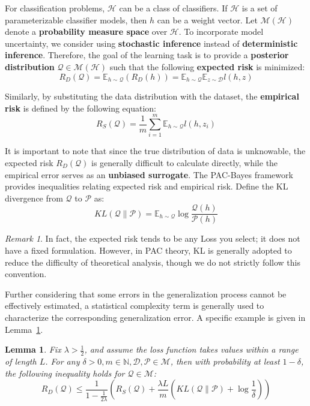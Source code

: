 \documentclass{article}
\theoremstyle{plain}
\newtheorem{lemma}[theorem]{Lemma}
\theoremstyle{definition}
\theoremstyle{remark}
\newtheorem{remark}[theorem]{Remark}
\begin{document}
For classification problems, $\mathcal{H}$ can be a class of classifiers. If $\mathcal{H}$ is a set of parameterizable classifier models, then $h$ can be a weight vector. Let $\mathcal{M}(\mathcal{H})$ denote a \textbf{probability measure space} over $\mathcal{H}$. To incorporate model uncertainty, we consider using \textbf{stochastic inference} instead of \textbf{deterministic inference}. Therefore, the goal of the learning task is to provide a \textbf{posterior distribution} $\mathcal{Q} \in \mathcal{M}(\mathcal{H})$ such that the following \textbf{expected risk} is minimized:
\begin{equation}
    R_D(\mathcal{Q}) = \mathbb{E}_{h \sim \mathcal{Q}}(R_D(h)) = \mathbb{E}_{h \sim \mathcal{Q}} \mathbb{E}_{z \sim \mathcal{D}} l(h, z)
\end{equation}

Similarly, by substituting the data distribution with the dataset, the \textbf{empirical risk} is defined by the following equation:
\begin{equation}
    R_S(\mathcal{Q}) = \frac{1}{m} \sum_{i=1}^m \mathbb{E}_{h \sim \mathcal{Q}} l(h, z_i)
\end{equation}

It is important to note that since the true distribution of data is unknowable, the expected risk $R_D(\mathcal{Q})$ is generally difficult to calculate directly, while the empirical error serves as an \textbf{unbiased surrogate}. The PAC-Bayes framework provides inequalities relating expected risk and empirical risk. Define the KL divergence from $\mathcal{Q}$ to $\mathcal{P}$ as:
\begin{equation}
    KL(\mathcal{Q} \| \mathcal{P}) = \mathbb{E}_{h \sim \mathcal{Q}} \log \frac{\mathcal{Q}(h)}{\mathcal{P}(h)}
\end{equation}

\begin{remark}
In fact, the expected risk tends to be any Loss you select; it does not have a fixed formulation. However, in PAC theory, KL is generally adopted to reduce the difficulty of theoretical analysis, though we do not strictly follow this convention.
\end{remark}

Further considering that some errors in the generalization process cannot be effectively estimated, a statistical complexity term is generally used to characterize the corresponding generalization error. A specific example is given in Lemma~\ref{byaes}.

\begin{lemma} \label{byaes}
Fix $\lambda > \frac{1}{2}$, and assume the loss function takes values within a range of length $L$. For any $\delta > 0, m \in \mathbb{N}, \mathcal{D}, \mathcal{P} \in \mathcal{M}$, then with probability at least $1-\delta$, the following inequality holds for $\mathcal{Q} \in \mathcal{M}$:
\begin{equation}
     R_D(\mathcal{Q}) \leq \frac{1}{1-\frac{1}{2\lambda}}\left(R_S(\mathcal{Q}) + \frac{\lambda L}{m}\left(KL(\mathcal{Q}\| \mathcal{P})+\log\frac{1}{\delta}\right)\right)
\end{equation}
\end{lemma}
\end{document}
